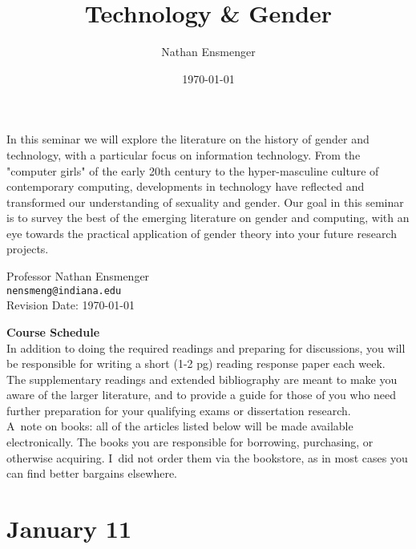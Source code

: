 \documentclass[11pt]{article}
\author{Nathan Ensmenger}
\date{\today}
\title{Technology \& Gender}
\begin{document}
\maketitle
In this seminar we will explore the literature on the history of gender and technology, with a particular focus on information technology. From the "computer girls" of the early 20th century to the hyper-masculine culture of contemporary computing, developments in technology have reflected and transformed our understanding of sexuality and gender. Our goal in this seminar is to survey the best of the emerging literature on gender and computing, with an eye towards the practical application of gender theory into your future research projects.

\vspace{0.1in}

\begin{center} 
 Professor Nathan Ensmenger\\ \texttt{nensmeng@indiana.edu}\\
\vspace{0.1in}
Revision Date: \today
\end{center}

\newpage
\textbf{Course Schedule}\\

In addition to doing the required readings and preparing for discussions, you will be responsible for writing a short (1-2 pg)
reading response paper each week.\\

The supplementary readings and extended bibliography are meant to make you aware of the larger literature, and to provide a guide for those of you who need further preparation for your qualifying exams or
dissertation research.\\

A note on books: all of the articles listed below will be made available electronically. The books you are responsible for borrowing, purchasing, or otherwise acquiring. I did not order them via the bookstore, as in most cases you can find better bargains elsewhere.

\small
\let\realeverypar\everypar
\realeverypar{\the\myeverypar\the\everypar}
\newtoks\everypar
\everypar{}
\newtoks\myeverypar \myeverypar{}


\section{January 11}
\end{document}
